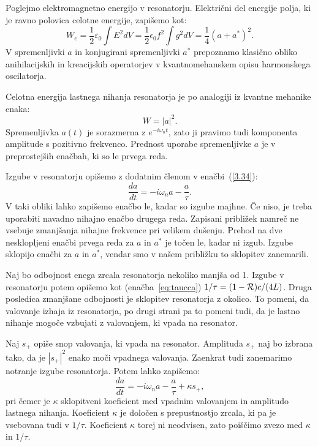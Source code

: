 Poglejmo elektromagnetno energijo v resonatorju. Električni
del energije polja, ki je ravno polovica celotne energije, zapišemo kot:
\begin{equation}
W_e = \frac{1}{2}\varepsilon_0 \int E^2 dV = \frac{1}{2}\epsilon_{0}f^{2}
\int g^{2}dV = \frac{1}{4} (a+a^{*})^2.
\end{equation}
V spremenljivki $a$ in konjugirani spremenljivki $a^{*}$ prepoznamo 
klasično obliko anihilacijskih in kreacijskih operatorjev v kvantnomehanskem 
opisu harmonskega oscilatorja. 

Celotna energija lastnega nihanja resonatorja je po analogiji iz kvantne mehanike enaka:
\begin{equation}
W=|a|^2.
\label{3.35}
\end{equation}
Spremenljivka $a(t)$ je sorazmerna z $e^{-i\omega_{n}t}$, 
zato ji pravimo tudi komponenta amplitude s pozitivno frekvenco. 
Prednost uporabe spremenljivke $a$ je v preprostejših enačbah, ki so le prvega reda. 

Izgube v resonatorju opišemo z dodatnim členom v enačbi~(\ref{3.34}):
\begin{equation}
\frac{da}{dt}=-i\omega_{n}a-\frac{a}{\tau}.
\label{3.36}
\end{equation}
V taki obliki lahko zapišemo enačbo le, kadar so izgube majhne. Če niso, 
je treba uporabiti navadno nihajno enačbo drugega reda. Zapisani približek
namreč ne vsebuje zmanjšanja nihajne frekvence pri velikem dušenju.
Prehod na dve nesklopljeni enačbi prvega reda za $a$ in $a^*$
je točen le, kadar ni izgub. Izgube sklopijo enačbi za $a$ in $a^{\ast}$, 
vendar smo v našem približku to sklopitev zanemarili.

Naj bo odbojnost enega zrcala resonatorja nekoliko manjša od 1. Izgube v resonatorju 
potem opišemo kot (enačba~\ref{eq:taucca}) $1/\tau=(1-{\cal R})c/(4L)$. Druga posledica
zmanjšane odbojnosti je sklopitev resonatorja z okolico. To pomeni, 
da valovanje izhaja iz resonatorja, po drugi strani pa to pomeni tudi, da je 
lastno nihanje mogoče vzbujati z valovanjem, ki vpada na resonator.

Naj $s_{+}$ opiše snop valovanja, ki vpada na resonator. Amplituda $s_{+}$
naj bo izbrana tako, da je $|s_{+}|^{2}$ enako moči vpadnega valovanja. Zaenkrat
tudi zanemarimo notranje izgube resonatorja. Potem lahko
zapišemo:
\begin{equation}
\frac{da}{dt}=-i\omega_{n}a-\frac{a}{\tau}+\kappa s_{+},
\label{3.37}
\end{equation}
pri čemer je $\kappa$ sklopitveni koeficient med vpadnim valovanjem in
amplitudo lastnega nihanja. Koeficient $\kappa$ je določen
s prepustnostjo zrcala, ki pa je vsebovana tudi v $1/\tau$. Koeficient
$\kappa$ torej ni neodvisen, zato poiščimo zvezo med $\kappa$ in $1/\tau$.

